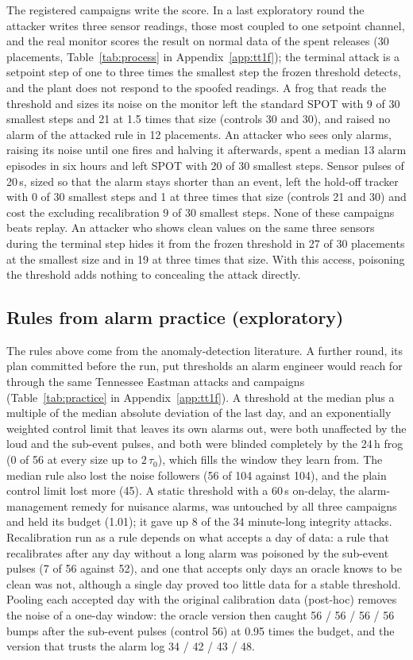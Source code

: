 \documentclass[letterpaper,twocolumn,10pt]{article}
\begin{document}
The registered campaigns write the score. In a last exploratory round the attacker writes three sensor
readings, those most coupled to one setpoint channel, and the real monitor scores the result on normal
data of the spent releases (30 placements, Table~\ref{tab:process} in Appendix~\ref{app:tt1f}); the terminal attack is a setpoint
step of one to three times the smallest step the frozen threshold detects, and the plant does not
respond to the spoofed readings. A frog that reads the threshold and sizes its noise on the monitor
left the standard SPOT with 9 of 30 smallest steps and 21 at 1.5 times that size (controls 30 and 30),
and raised no alarm of the attacked rule in 12 placements. An attacker who sees only alarms, raising
its noise until one fires and halving it afterwards, spent a median 13 alarm episodes in six hours
and left SPOT with 20 of 30 smallest steps. Sensor pulses of 20\,s, sized so that the alarm stays shorter
than an event, left the hold-off tracker with 0 of 30 smallest steps and 1 at three times that size
(controls 21 and 30) and cost the excluding recalibration 9 of 30 smallest steps. None of these
campaigns beats replay. An attacker who shows clean values on the same three sensors during the
terminal step hides it from the frozen threshold in 27 of 30 placements at the smallest size and in
19 at three times that size. With this access, poisoning the threshold adds nothing to concealing
the attack directly.

\subsection{Rules from alarm practice (exploratory)}
\label{sec:practice}

The rules above come from the anomaly-detection literature. A further round, its plan committed before
the run, put thresholds an alarm engineer would reach for through the same Tennessee Eastman attacks and
campaigns (Table~\ref{tab:practice} in Appendix~\ref{app:tt1f}). A threshold at the median plus a
multiple of the median absolute deviation of the last day, and an exponentially weighted control limit
that leaves its own alarms out, were both unaffected by the loud and the sub-event pulses, and both were
blinded completely by the 24\,h frog (0 of 56 at every size up to $2\,\tau_0$), which fills the window
they learn from. The median rule also lost the noise followers (56 of 104 against 104), and the plain
control limit lost more (45). A static threshold with a 60\,s on-delay, the alarm-management remedy for
nuisance alarms, was untouched by all three campaigns and held its budget (1.01); it gave up 8 of the 34
minute-long integrity attacks. Recalibration run as a rule depends on what accepts a day of data: a rule
that recalibrates after any day without a long alarm was poisoned by the sub-event pulses (7 of 56
against 52), and one that accepts only days an oracle knows to be clean was not, although a single day proved
too little data for a stable threshold. Pooling each accepted day with the original calibration data (post-hoc) removes the noise of a one-day window:
the oracle version then caught 56 / 56 / 56 / 56 bumps after the sub-event pulses (control 56) at
0.95 times the budget, and the version that trusts the alarm log 34 / 42 / 43 / 48.
\end{document}
